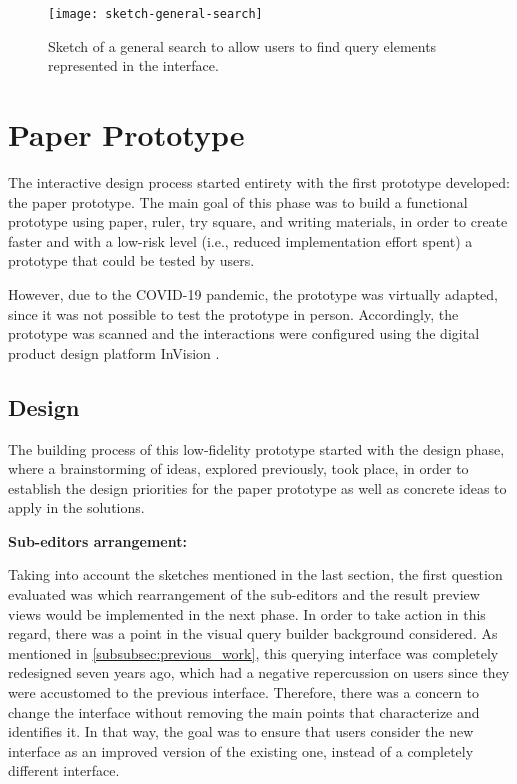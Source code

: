 \begin{figure}[htbp]
	\centering
	\texttt{[image: sketch-general-search]}
	\caption{Sketch of a general search to allow users to find query elements represented in the interface.}
	\label{fig:sketchGeneralSearch}
\end{figure}


\section{Paper Prototype}
\label{sec:paper_prototype}
The interactive design process started entirety with the first prototype developed: the paper prototype. The main goal of this phase was to build a functional prototype using paper, ruler, try square, and writing materials, in order to create faster and with a low-risk level (i.e., reduced implementation effort spent) a prototype that could be tested by users.

However, due to the COVID-19 pandemic, the prototype was virtually adapted, since it was not possible to test the prototype in person. Accordingly, the prototype was scanned and the interactions were configured using the digital product design platform InVision \cite{invision}.

\subsection{Design}
\label{subsec:paper_prototype_design}
The building process of this low-fidelity prototype started with the design phase, where a brainstorming of ideas, explored previously, took place, in order to establish the design priorities for the paper prototype as well as concrete ideas to apply in the solutions.

\medskip

\textbf{Sub-editors arrangement:}

\medskip

Taking into account the sketches mentioned in the last section, the first question evaluated was which rearrangement of the sub-editors and the result preview views would be implemented in the next phase. In order to take action in this regard, there was a point in the visual query builder background considered. As mentioned in \ref{subsubsec:previous_work}, this querying interface was completely redesigned seven years ago, which had a negative repercussion on users since they were accustomed to the previous interface. Therefore, there was a concern to change the interface without removing the main points that characterize and identifies it. In that way, the goal was to ensure that users consider the new interface as an improved version of the existing one, instead of a completely different interface.

